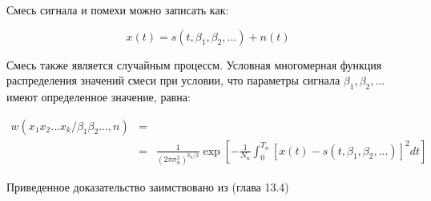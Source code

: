 Смесь сигнала и помехи можно записать как:
\begin{center}
\begin{equation}
	\label{eq:signal_and_noise}
	x(t) = s(t, \beta_1, \beta_2, ...) + n(t)
\end{equation}
\end{center}
Смесь также является случайным процессм. Условная многомерная функция распределения значений смеси при условии, что параметры
сигнала ${\beta_1, \beta_2, ...}$ имеют определенное значение, равна:
\begin{center}
\begin{eqnarray}
	\label{eq:signal_and_noise2}
	w(x_{1}x_{2}...x_{k}/\beta_1 \beta_2 ..., n) & = & \\
	& = & \frac{1}{(2\pi\sigma_{n}^{2})^{k_n/2}}\exp[-\frac{1}{N_n}\int_{0}^{T_n}[x(t) - s(t, \beta_1, \beta_2, ...)]^2 dt] \nonumber
\end{eqnarray}
\end{center}



Приведенное доказательство заимствовано из \cite{pugachev} (глава 13.4)

\newpage
